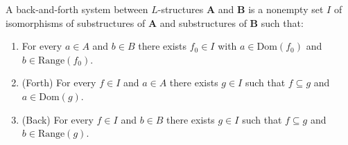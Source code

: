 A back-and-forth system between $L$-structures $\mathbf{A}$ and $\mathbf{B}$ is a nonempty set $I$ of isomorphisms of substructures of $\mathbf{A}$ and substructures of $\mathbf{B}$ such that:

\begin{enumerate}
  \item For every $a \in A$ and $b \in B$ there exists $f_0 \in I$ with $a \in \text{Dom}(f_0)$ and $b \in \text{Range}(f_0)$.
  \item (Forth) For every $f \in I$ and $a \in A$ there exists $g \in I$ such that $f \subseteq g$ and $a \in \text{Dom}(g)$.
  \item (Back) For every $f \in I$ and $b \in B$ there exists $g \in I$ such that $f \subseteq g$ and $b \in \text{Range}(g)$.
\end{enumerate}
